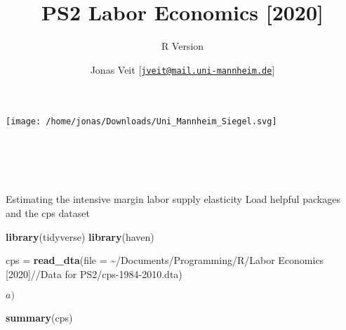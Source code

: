 \documentclass[
  ignorenonframetext,
]{beamer}
\title{PS2 Labor Economics {[}2020{]}}
\subtitle{R Version}
\author{Jonas Veit
{[}\href{mailto:jveit@mail.uni-mannheim.de}{\nolinkurl{jveit@mail.uni-mannheim.de}}{]}}
\date{}
\newenvironment{Shaded}{\begin{snugshade}}{\end{snugshade}}
\newcommand{\DataTypeTok}[1]{\textcolor[rgb]{0.13,0.29,0.53}{#1}}
\newcommand{\KeywordTok}[1]{\textcolor[rgb]{0.13,0.29,0.53}{\textbf{#1}}}
\newcommand{\NormalTok}[1]{#1}
\newcommand{\StringTok}[1]{\textcolor[rgb]{0.31,0.60,0.02}{#1}}
\begin{document}
\frame{\titlepage}

\begin{frame}
\hfill\break
\hfill\break
\hfill\break

\hfill\break
\hfill\break
\hfill\break
\hfill\break
\texttt{[image: /home/jonas/Downloads/Uni\_Mannheim\_Siegel.svg]}\\
~\\
~\\
~\\
~\\
\end{frame}

\begin{frame}[fragile]{Estimating the intensive margin labor supply
elasticity}
\protect\hypertarget{estimating-the-intensive-margin-labor-supply-elasticity}{}
\hfill\break
\hfill\break
\hfill\break
Load helpful packages and the cps dataset

\begin{Shaded}
\begin{Highlighting}[]
\KeywordTok{library}\NormalTok{(tidyverse)}
\KeywordTok{library}\NormalTok{(haven)}

\NormalTok{cps =}\StringTok{ }\KeywordTok{read\_dta}\NormalTok{(}\DataTypeTok{file =} \StringTok{\textquotesingle{}\textasciitilde{}/Documents/Programming/R/Labor Economics [2020]//Data for PS2/cps{-}1984{-}2010.dta\textquotesingle{}}\NormalTok{)}
\end{Highlighting}
\end{Shaded}

\hfill\break
\hfill\break
\hfill\break

\begin{block}{\(a)\)}
\protect\hypertarget{a}{}
\begin{Shaded}
\begin{Highlighting}[]
\KeywordTok{summary}\NormalTok{(cps)}
\end{Highlighting}
\end{Shaded}


\end{block}
\end{frame}
\end{document}
